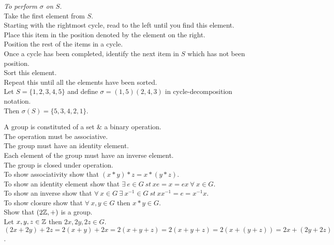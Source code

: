 \documentclass[11pt,a4paper]{article}
\begin{document}
\textit{To perform $\sigma$ on $S$}.\\
Take the first element from $S$.\\
Starting with the rightmost cycle, read to the left until you find this element.\\
Place this item in the position denoted by the element on the right.\\
Position the rest of the items in a cycle.\\
Once a cycle has been completed, identify the next item in $S$ which has not been position.\\
Sort this element.\\
Repeat this until all the elements have been sorted.\\

Let $S=\{1,2,3,4,5\}$ and define $\sigma = (1,5)(2,4,3)$ in cycle-decomposition notation.\\
Then $\sigma(S) = \{5,3,4,2,1\}$.\\


A group is constituted of a set \& a binary operation.\\
The operation must be associative.\\
The group must have an identity element.\\
Each element of the group must have an inverse element.\\
The group is closed under operation.\\

To show associativity show that $(x * y) * z = x * (y * z)$.\\
To show an identity element show that $\exists\ e \in G\ st\ xe = x = ex\ \forall\ x \in G$.\\
To show an inverse show that $\forall\ x \in G\ \exists\ x^{-1} \in G\ st\ xx^{-1} = e = x^{-1}x$.\\
To show closure show that $\forall\ x, y \in G$ then $x * y \in G$.\\

\newpage{}
Show that $(2\mathbb{Z}, +)$ is a group.\\

Let $x, y, z \in \mathbb{Z}$ then $2x, 2y, 2z \in G$.\\
$(2x + 2y) + 2z = 2(x+y)+2x=2(x+y+z)=2(x+y+z)=2(x+(y+z))=2x+(2y+2z)$.\\
\end{document}
